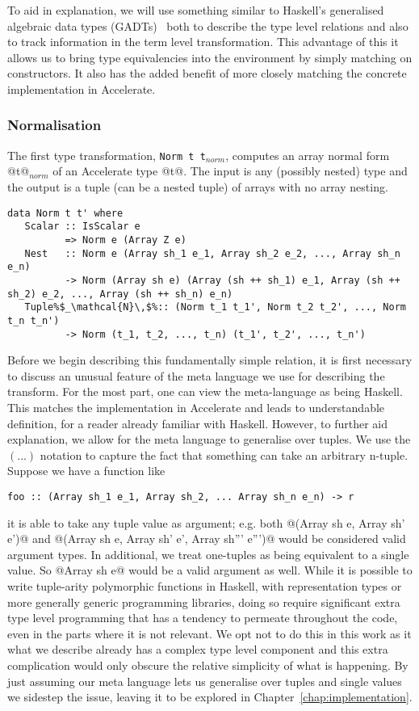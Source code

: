 To aid in explanation, we will use something similar to Haskell's generalised algebraic data types (GADTs)~\citep{Jones:2006eh} both to describe the type level relations and also to track information in the term level transformation. This advantage of this it allows us to bring type equivalencies into the environment by simply matching on constructors. It also has the added benefit of more closely matching the concrete implementation in Accelerate.

\subsubsection{Normalisation}
The first type transformation, \lstinline[style=ndp]{Norm t t}$_{\textit{norm}}$, computes an array normal form @t@$_{\textit{norm}}$ of an Accelerate type @t@. The input is any (possibly nested) type and the output is a tuple (can be a nested tuple) of arrays with no array nesting.

\begin{lstlisting}[style=ndp]
data Norm t t' where
   Scalar :: IsScalar e
          => Norm e (Array Z e)
   Nest   :: Norm e (Array sh_1 e_1, Array sh_2 e_2, ..., Array sh_n e_n)
          -> Norm (Array sh e) (Array (sh ++ sh_1) e_1, Array (sh ++ sh_2) e_2, ..., Array (sh ++ sh_n) e_n)
   Tuple%$_\mathcal{N}\,$%:: (Norm t_1 t_1', Norm t_2 t_2', ..., Norm t_n t_n')
          -> Norm (t_1, t_2, ..., t_n) (t_1', t_2', ..., t_n')
\end{lstlisting}

Before we begin describing this fundamentally simple relation, it is first necessary to discuss an unusual feature of the meta language we use for describing the transform. For the most part, one can view the meta-language as being Haskell. This matches the implementation in Accelerate and leads to understandable definition, for a reader already familiar with Haskell. However, to further aid explanation, we allow for the meta language to generalise over tuples. We use the $(...)$ notation to capture the fact that something can take an arbitrary n-tuple. Suppose we have a function like
%
\begin{lstlisting}
foo :: (Array sh_1 e_1, Array sh_2, ... Array sh_n e_n) -> r
\end{lstlisting}
%
it is able to take any tuple value as argument; e.g. both @(Array sh e, Array sh' e')@ and @(Array sh e, Array sh' e', Array sh''' e''')@ would be considered valid argument types. In additional, we treat one-tuples as being equivalent to a single value. So @Array sh e@ would be a valid argument as well. While it is possible to write tuple-arity polymorphic functions in Haskell, with representation types or more generally generic programming libraries, doing so require significant extra type level programming that has a tendency to permeate throughout the code, even in the parts where it is not relevant. We opt not to do this in this work as it what we describe already has a complex type level component and this extra complication would only obscure the relative simplicity of what is happening. By just assuming our meta language lets us generalise over tuples and single values we sidestep the issue, leaving it to be explored in Chapter~\ref{chap:implementation}.

